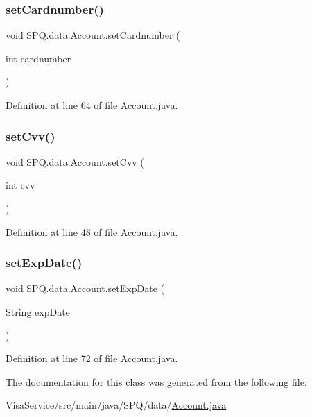 \subsubsection{\texorpdfstring{set\+Cardnumber()}{setCardnumber()}}
{\footnotesize\ttfamily void S\+P\+Q.\+data.\+Account.\+set\+Cardnumber (\begin{DoxyParamCaption}\item[{int}]{cardnumber }\end{DoxyParamCaption})}



Definition at line 64 of file Account.\+java.

\mbox{\label{class_s_p_q_1_1data_1_1_account_a572b5452dceb62eea2d1f63b6df90be7}} 
\subsubsection{\texorpdfstring{set\+Cvv()}{setCvv()}}
{\footnotesize\ttfamily void S\+P\+Q.\+data.\+Account.\+set\+Cvv (\begin{DoxyParamCaption}\item[{int}]{cvv }\end{DoxyParamCaption})}



Definition at line 48 of file Account.\+java.

\mbox{\label{class_s_p_q_1_1data_1_1_account_a4c4a9c7f817a565893668bcc634ec143}} 
\subsubsection{\texorpdfstring{set\+Exp\+Date()}{setExpDate()}}
{\footnotesize\ttfamily void S\+P\+Q.\+data.\+Account.\+set\+Exp\+Date (\begin{DoxyParamCaption}\item[{String}]{exp\+Date }\end{DoxyParamCaption})}



Definition at line 72 of file Account.\+java.



The documentation for this class was generated from the following file\+:\begin{DoxyCompactItemize}
\item 
Visa\+Service/src/main/java/\+S\+P\+Q/data/\mbox{\hyperlink{_account_8java}{Account.\+java}}\end{DoxyCompactItemize}
